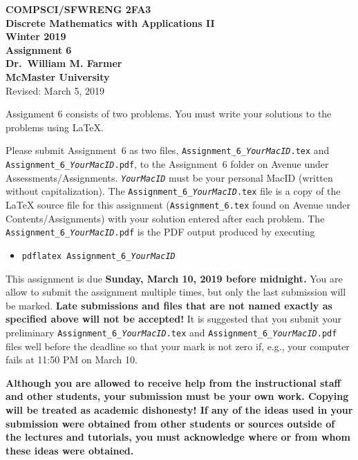 \documentclass[11pt,fleqn]{article}
\begin{document}
\begin{center}

  {\large \textbf{COMPSCI/SFWRENG 2FA3}}\\[2mm]
  {\large \textbf{Discrete Mathematics with Applications II}}\\[2mm]
  {\large \textbf{Winter 2019}}\\[8mm]
  {\huge \textbf{Assignment 6}}\\[6mm]
  {\large \textbf{Dr.~William M. Farmer}}\\[2mm]
  {\large \textbf{McMaster University}}\\[6mm]
  {\large Revised: March 5, 2019}

\end{center}

\medskip

Assignment 6 consists of two problems.  You must write your solutions
to the problems using LaTeX.

Please submit Assignment~6 as two files,
\texttt{Assignment\_6\_\emph{YourMacID}.tex} and
\texttt{Assignment\_6\_\emph{YourMacID}.pdf}, to the Assignment~6
folder on Avenue under Assessments/Assignments.
\texttt{\emph{YourMacID}} must be your personal MacID (written without
capitalization).  The \texttt{Assignment\_6\_\emph{YourMacID}.tex}
file is a copy of the LaTeX source file for this assignment
(\texttt{Assignment\_6.tex} found on Avenue under
Contents/Assignments) with your solution entered after each problem.
The \texttt{Assignment\_6\_\emph{YourMacID}.pdf} is the PDF output
produced by executing

\begin{itemize}

  \item[] \texttt{pdflatex Assignment\_6\_\emph{YourMacID}}

\end{itemize}

This assignment is due \textbf{Sunday, March 10, 2019 before
  midnight.}  You are allow to submit the assignment multiple times,
but only the last submission will be marked.  \textbf{Late submissions
  and files that are not named exactly as specified above will not be
  accepted!}  It is suggested that you submit your preliminary
\texttt{Assignment\_6\_\emph{YourMacID}.tex} and
\texttt{Assignment\_6\_\emph{YourMacID}.pdf} files well before the
deadline so that your mark is not zero if, e.g., your computer fails
at 11:50 PM on March 10.

\textbf{Although you are allowed to receive help from the
  instructional staff and other students, your submission must be your
  own work.  Copying will be treated as academic dishonesty! If any of
  the ideas used in your submission were obtained from other students
  or sources outside of the lectures and tutorials, you must
  acknowledge where or from whom these ideas were obtained.}
\end{document}
